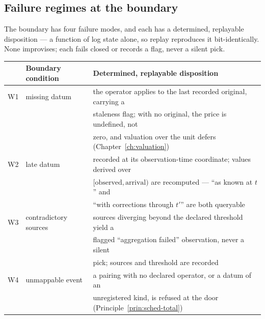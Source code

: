 \subsection{Failure regimes at the boundary}\label{sec:failures}

The boundary has four failure modes, and each has a determined, replayable disposition --- a
function of log state alone, so replay reproduces it bit-identically. None improvises; each
fails closed or records a flag, never a silent pick.

\begin{center}
\begin{tabular}{@{}lll@{}}
\toprule
 & Boundary condition & Determined, replayable disposition \\
\midrule
W1 & missing datum & the operator applies to the last recorded original, carrying a \\
   &               & staleness flag; with no original, the price is undefined, not \\
   &               & zero, and valuation over the unit defers (Chapter~\ref{ch:valuation}) \\
W2 & late datum & recorded at its observation-time coordinate; values derived over \\
   &            & $[\text{observed},\text{arrival})$ are recomputed --- ``as known at $t$'' and \\
   &            & ``with corrections through $t'$'' are both queryable \\
W3 & contradictory sources & sources diverging beyond the declared threshold yield a \\
   &                       & flagged ``aggregation failed'' observation, never a silent \\
   &                       & pick; sources and threshold are recorded \\
W4 & unmappable event & a pairing with no declared operator, or a datum of an \\
   &                  & unregistered kind, is refused at the door (Principle~\ref{prin:sched-total}) \\
\bottomrule
\end{tabular}
\end{center}

